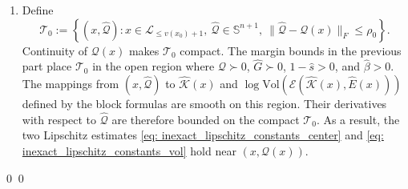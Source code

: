 \documentclass[smallextended]{svjour3}
\let\springerproof\proof
\let\endspringerproof\endproof
\renewenvironment{proof}{\springerproof}{%
  \ifhmode\qed\else\leavevmode\qed\fi\endspringerproof}
\newcommand{\V}{{\mathrm{Vol}}}
\newcommand{\K}{\mathcal{K}}
\newcommand{\E}{\mathcal{E}}
\newcommand{\wh}{\widehat}
\renewcommand{\S}{\mathbb{S}}
\begin{document}
\begin{proof}
\begin{enumerate}
        \item Define
        \[
            \mathcal{T}_0:=\left\{(x,\wh{\mathcal{Q}}):
            x\in \mathcal{L}_{\leq v(x_0)+1},\ \wh{\mathcal{Q}}\in\S^{n+1},\
            \|\wh{\mathcal{Q}} -\mathcal{Q}(x)\|_F\le \rho_0\right\}.
        \]
        Continuity of $\mathcal Q(x)$ makes $\mathcal{T}_0$ compact. The margin
        bounds in the previous part place $\mathcal{T}_0$ in the open region where
        $\wh{\mathcal{Q}} \succ0$, $\wh{G} \succ 0$, $1-\wh{s} >0$, and $\wh{\beta} >0$.
        The mappings from $(x,\wh{\mathcal{Q}})$ to $\wh{\K}(x)$ and  $\log\V(\E(\widehat{\K}(x),\widehat{E}(x)))$
        defined by the block formulas are smooth on this region. Their
        derivatives with respect to $\widehat{\mathcal{Q}}$ are therefore bounded on the
        compact $\mathcal{T}_0$. As a result, the two Lipschitz estimates \eqref{eq: inexact_lipschitz_constants_center} and \eqref{eq: inexact_lipschitz_constants_vol} hold near $(x, \mathcal{Q}(x))$.
    \end{enumerate}
\end{proof}
\end{document}
